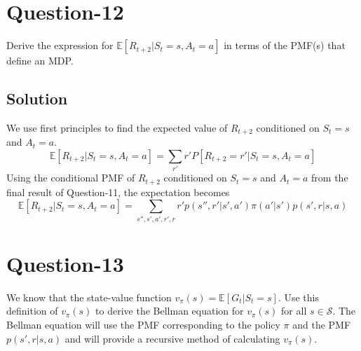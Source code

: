 \documentclass[11pt]{article}
\begin{document}
    \section*{Question-12}
    Derive the expression for $\mathbb{E}[R_{t+2} | S_{t} = s, A_{t} = a]$ in terms of the PMF(s) that define
    an MDP.

    \subsection*{Solution}
    We use first principles to find the expected value of $R_{t+2}$ conditioned on $S_{t} = s$ and $A_{t} = a$.
    $$\mathbb{E}[R_{t+2} | S_{t} = s, A_{t} = a] = \sum_{r'} r' P[R_{t+2} = r' | S_{t} = s, A_{t} = a]$$
    Using the conditional PMF of $R_{t+2}$ conditioned on $S_{t} = s$ and $A_{t} = a$ from the final result of
    Question-11, the expectation becomes
    $$\mathbb{E}[R_{t+2} | S_{t} = s, A_{t} = a] = \sum_{s'', s', a', r', r} r' p(s'', r' | s', a') \pi(a' | s')  p(s', r | s, a)$$

    \section*{Question-13}
    We know that the state-value function $v_{\pi}(s) = \mathbb{E}[G_{t} | S_{t} = s]$. Use this definition of
    $v_{\pi}(s)$ to derive the Bellman equation for $v_{\pi}(s)$ for all $s \in \mathcal{S}$. The Bellman equation
    will use the PMF corresponding to the policy $\pi$ and the PMF $p(s', r | s, a)$ and will provide a recursive
    method of calculating $v_{\pi}(s)$.
\end{document}
